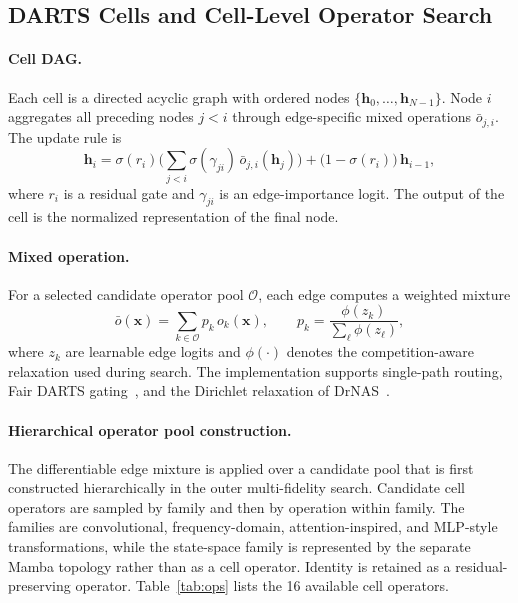 \subsection{DARTS Cells and Cell-Level Operator Search}
\label{sec:cell}

\paragraph{Cell DAG.}
Each cell is a directed acyclic graph with ordered nodes
$\{\mathbf{h}_0, \ldots, \mathbf{h}_{N-1}\}$. Node $i$ aggregates all
preceding nodes $j < i$ through edge-specific mixed operations
$\bar{o}_{j,i}$. The update rule is
%
\begin{equation}
    \mathbf{h}_i
    = \sigma(r_i)
      \Bigg(\sum_{j < i} \sigma(\gamma_{ji})\,
        \bar{o}_{j,i}(\mathbf{h}_j)
      \Bigg)
      + \bigl(1 - \sigma(r_i)\bigr)\,\mathbf{h}_{i-1},
    \label{eq:cell}
\end{equation}
%
where $r_i$ is a residual gate and $\gamma_{ji}$ is an edge-importance logit.
The output of the cell is the normalized representation of the final node.

\paragraph{Mixed operation.}
For a selected candidate operator pool $\mathcal{O}$, each edge computes a
weighted mixture
%
\begin{equation}
    \bar{o}(\mathbf{x}) = \sum_{k \in \mathcal{O}} p_k\,o_k(\mathbf{x}),
    \qquad
    p_k = \frac{\phi(z_k)}{\sum_{\ell}\phi(z_{\ell})},
    \label{eq:mixedop}
\end{equation}
%
where $z_k$ are learnable edge logits and $\phi(\cdot)$ denotes the
competition-aware relaxation used during search. The implementation supports
single-path routing, Fair DARTS gating~\citep{chu2021fair}, and the
Dirichlet relaxation of DrNAS~\citep{chen2021drnas}.

\paragraph{Hierarchical operator pool construction.}
The differentiable edge mixture is applied over a candidate pool that is first
constructed hierarchically in the outer multi-fidelity search. Candidate cell
operators are sampled by family and then by operation within family. The
families are convolutional, frequency-domain, attention-inspired, and
MLP-style transformations, while the state-space family is represented by the
separate Mamba topology rather than as a cell operator. Identity is retained
as a residual-preserving operator. Table~\ref{tab:ops} lists the 16 available
cell operators.

